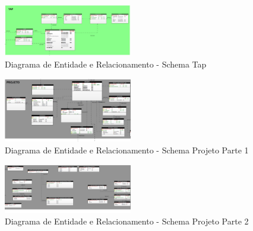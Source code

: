 \documentclass{acm_proc_article-sp}
\begin{document}
\begin{figure}[h]
\centering %
\includegraphics[width=0.5\textwidth]{DER_tap.jpg} %
\caption{Diagrama de Entidade e Relacionamento - Schema Tap}
\end{figure}

\begin{figure}[h]
\centering %
\includegraphics[width=0.5\textwidth]{DER_projeto_p1.jpg} %
\caption{Diagrama de Entidade e Relacionamento - Schema Projeto Parte 1}
\end{figure}

\begin{figure}[h]
\centering %
\includegraphics[width=0.5\textwidth]{DER_projeto_p2.jpg} %
\caption{Diagrama de Entidade e Relacionamento - Schema Projeto Parte 2}
\end{figure}
\end{document}
